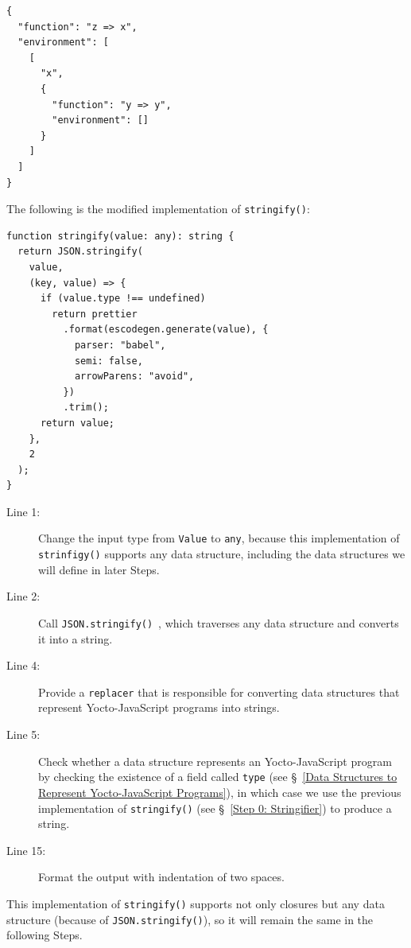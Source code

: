 \documentclass[12pt, oneside]{book}
\begin{document}
\begin{verbatim}
{
  "function": "z => x",
  "environment": [
    [
      "x",
      {
        "function": "y => y",
        "environment": []
      }
    ]
  ]
}
\end{verbatim}

The following is the modified implementation of \texttt{stringify()}:

\begin{verbatim}
function stringify(value: any): string {
  return JSON.stringify(
    value,
    (key, value) => {
      if (value.type !== undefined)
        return prettier
          .format(escodegen.generate(value), {
            parser: "babel",
            semi: false,
            arrowParens: "avoid",
          })
          .trim();
      return value;
    },
    2
  );
}
\end{verbatim}

\begin{description}
\item [Line 1:] Change the input type from \texttt{Value} to \texttt{any}, because this implementation of \texttt{strinfigy()} supports any data structure, including the data structures we will define in later Steps.

\item [Line 2:] Call \texttt{JSON.stringify()}~\cite{javascript-json-stringify}, which traverses any data structure and converts it into a string.

\item [Line 4:] Provide a \texttt{replacer} that is responsible for converting data structures that represent Yocto-JavaScript programs into strings.

\item [Line 5:] Check whether a data structure represents an Yocto-JavaScript program by checking the existence of a field called \texttt{type} (see §~\ref{Data Structures to Represent Yocto-JavaScript Programs}), in which case we use the previous implementation of \texttt{stringify()} (see §~\ref{Step 0: Stringifier}) to produce a string.

\item [Line 15:] Format the output with indentation of two spaces.
\end{description}

This implementation of \texttt{stringify()} supports not only closures but any data structure (because of \texttt{JSON.stringify()}), so it will remain the same in the following Steps.
\end{document}

